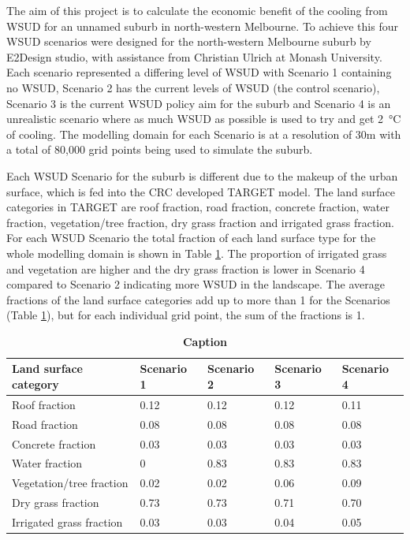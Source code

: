 \documentclass[final,3p,times,authoryear]{elsarticle}
\begin{document}
The aim of this project is to calculate the economic benefit of the cooling from WSUD for an unnamed suburb in north-western Melbourne. To achieve this four WSUD scenarios were designed for the north-western Melbourne suburb by E2Design studio, with assistance from Christian Ulrich at Monash University. Each scenario represented a differing level of WSUD with Scenario 1 containing no WSUD, Scenario 2 has the current levels of WSUD (the control scenario), Scenario 3 is the current WSUD policy aim for the suburb and Scenario 4 is an unrealistic scenario where as much WSUD as possible is used to try and get 2\SI{}{\degreeCelsius} of cooling. The modelling domain for each Scenario is at a resolution of 30m with a total of 80,000 grid points being used to simulate the suburb.

Each WSUD Scenario for the suburb is different due to the makeup of the urban surface, which is fed into the CRC developed TARGET model. The land surface categories in TARGET are roof fraction, road fraction, concrete fraction, water fraction, vegetation/tree fraction, dry grass fraction and irrigated grass fraction. For each WSUD Scenario the total fraction of each land surface type for the whole modelling domain is shown in Table \ref{tab:parameters}. The proportion of irrigated grass and vegetation are higher and the dry grass fraction is lower in Scenario 4 compared to Scenario 2 indicating more WSUD in the landscape. The average fractions of the land surface categories add up to more than 1 for the Scenarios (Table \ref{tab:parameters}), but for each individual grid point, the sum of the fractions is 1.


\begin{table}[!htbp]
\caption{\bf Caption  \label{tab:parameters}}     
\begin{tabular}{ l l l l l}
\textbf{Land surface category} & \textbf{Scenario 1} & \textbf{Scenario 2}  & \textbf{Scenario 3} & \textbf{Scenario 4}\\ \hline
Roof fraction & 0.12 & 0.12 & 0.12 & 0.11 \\ 
Road fraction & 0.08 & 0.08 & 0.08 & 0.08 \\ 
Concrete fraction & 0.03 & 0.03 & 0.03 & 0.03 \\ 
Water fraction & 0 & 0.83 & 0.83 & 0.83 \\ 
Vegetation/tree fraction & 0.02 & 0.02 & 0.06 & 0.09 \\ 
Dry grass fraction & 0.73 & 0.73 & 0.71 & 0.70 \\ 
Irrigated grass fraction & 0.03 & 0.03 & 0.04 & 0.05 \\ 
\hline
\end{tabular}
\end{table}
\end{document}
